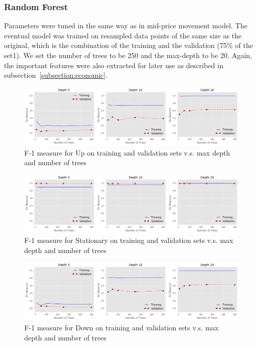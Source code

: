 \documentclass[11pt]{article}
\begin{document}
\subsubsection{Random Forest}
Parameters were tuned in the same way as in mid-price movement model. The eventual model was trained on resampled data points of the same size as the original, which is the combination of the training and the validation (75\% of the set1). We set the number of trees to be 250 and the max-depth to be 20. Again, the important features were also extracted for later use as described in subsection~\ref{subsection:economic}.
\begin{figure}[H]
\centering
\includegraphics [width=1\linewidth,height=0.25\linewidth]{./figures/tree_spread_up_f1.png}
\caption{F-1 measure for Up on training and validation sets v.s. max depth and number of trees}
\label{fig:spread_f1_1}
\end{figure}
\begin{figure}[H]
\centering
\includegraphics [width=1\linewidth,height=0.25\linewidth]{./figures/tree_spread_stat_f1.png}
\caption{F-1 measure for Stationary on training and validation sets v.s. max depth and number of trees}
\label{fig:spread_f1_2}
\end{figure}
\begin{figure}[H]
\centering
\includegraphics [width=1\linewidth,height=0.25\linewidth]{./figures/tree_spread_down_f1.png}
\caption{F-1 measure for Down on training and validation sets v.s. max depth and number of trees}
\label{fig:spread_f1_3}
\end{figure}
\end{document}
